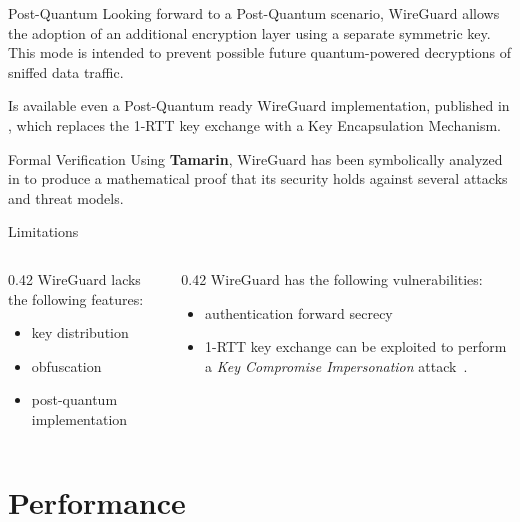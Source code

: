 \documentclass[light]{presenta}
\begin{document}
\begin{frame}{Post-Quantum}
  Looking forward to a Post-Quantum scenario, WireGuard allows the adoption of an additional encryption layer using a separate symmetric key.
  This mode is intended to prevent possible future quantum-powered decryptions of sniffed data traffic.

  \bigskip
  Is available even a Post-Quantum ready WireGuard implementation, published in \cite{pq-wireguard}, which replaces the 1-RTT key exchange with a Key Encapsulation Mechanism.
\end{frame}

\begin{frame}{Formal Verification}
  Using \textbf{Tamarin}, WireGuard has been symbolically analyzed in \cite{wireguardverification} to produce a mathematical proof that its security holds against several attacks and threat models.
\end{frame}

\begin{frame}{Limitations}

  \begin{columns}
    \begin{column}[t]{0.42\paperwidth}
      \justifying
      WireGuard lacks the following features:
      \begin{itemize}
        \item key distribution
        \item obfuscation
        \item post-quantum implementation
      \end{itemize}
    \end{column}
    \pause
    \begin{column}[t]{0.42\paperwidth}
      \justifying
      WireGuard has the following vulnerabilities:
      \begin{itemize}
        \item authentication forward secrecy
        \item 1-RTT key exchange can be exploited to perform a \textit{Key Compromise Impersonation} attack~\cite{secanalysis}.
      \end{itemize}
    \end{column}
  \end{columns}
\end{frame}

\section{Performance}
\end{document}
